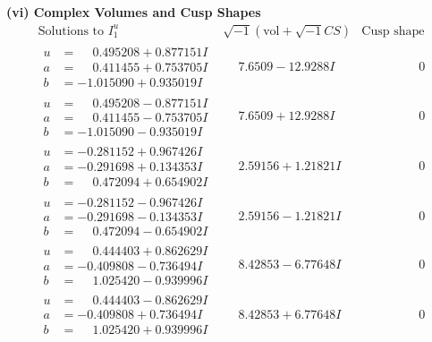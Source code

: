 \documentclass[1p]{elsarticle_modified}
\theoremstyle{definition}
\newcommand{\I}{\sqrt{-1}}
\begin{document}
\newpage\flushleft \textbf{(vi) Complex Volumes and Cusp Shapes}
$$\begin{array}{c|c|c}  
\text{Solutions to }I^u_{1}& \I (\text{vol} + \sqrt{-1}CS) & \text{Cusp shape}\\
 \hline 
\begin{aligned}
u &= \phantom{-}0.495208 + 0.877151 I \\
a &= \phantom{-}0.411455 + 0.753705 I \\
b &= -1.015090 + 0.935019 I\end{aligned}
 & \phantom{-}7.6509 - 12.9288 I & \phantom{-0.000000 } 0 \\ \hline\begin{aligned}
u &= \phantom{-}0.495208 - 0.877151 I \\
a &= \phantom{-}0.411455 - 0.753705 I \\
b &= -1.015090 - 0.935019 I\end{aligned}
 & \phantom{-}7.6509 + 12.9288 I & \phantom{-0.000000 } 0 \\ \hline\begin{aligned}
u &= -0.281152 + 0.967426 I \\
a &= -0.291698 + 0.134353 I \\
b &= \phantom{-}0.472094 + 0.654902 I\end{aligned}
 & \phantom{-}2.59156 + 1.21821 I & \phantom{-0.000000 } 0 \\ \hline\begin{aligned}
u &= -0.281152 - 0.967426 I \\
a &= -0.291698 - 0.134353 I \\
b &= \phantom{-}0.472094 - 0.654902 I\end{aligned}
 & \phantom{-}2.59156 - 1.21821 I & \phantom{-0.000000 } 0 \\ \hline\begin{aligned}
u &= \phantom{-}0.444403 + 0.862629 I \\
a &= -0.409808 - 0.736494 I \\
b &= \phantom{-}1.025420 - 0.939996 I\end{aligned}
 & \phantom{-}8.42853 - 6.77648 I & \phantom{-0.000000 } 0 \\ \hline\begin{aligned}
u &= \phantom{-}0.444403 - 0.862629 I \\
a &= -0.409808 + 0.736494 I \\
b &= \phantom{-}1.025420 + 0.939996 I\end{aligned}
 & \phantom{-}8.42853 + 6.77648 I & \phantom{-0.000000 } 0 \\ \hline\begin{aligned}

\end{aligned}
\end{array}$$
\end{document}
